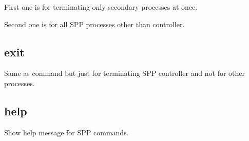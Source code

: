 \documentclass[a4paper,11pt,openany,oneside,english]{sphinxmanual}
\begin{document}
First one is for terminating only secondary processes at once.

\begin{sphinxVerbatim}[commandchars=\\\{\},formatcom=\footnotesize]
\end{sphinxVerbatim}

Second one is for all SPP processes other than controller.

\begin{sphinxVerbatim}[commandchars=\\\{\},formatcom=\footnotesize]
\end{sphinxVerbatim}


\subsection{exit}
\label{\detokenize{commands/common:exit}}\label{\detokenize{commands/common:commands-common-exit}}
Same as  command but just for terminating SPP controller and
not for other processes.

\begin{sphinxVerbatim}[commandchars=\\\{\},formatcom=\footnotesize]
\end{sphinxVerbatim}


\subsection{help}
\label{\detokenize{commands/common:help}}\label{\detokenize{commands/common:commands-common-help}}
Show help message for SPP commands.
\end{document}
